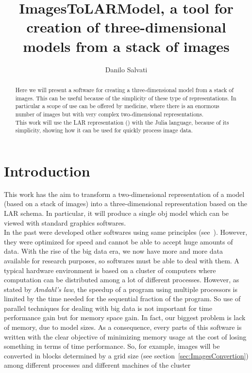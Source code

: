 \documentclass[11pt,oneside]{article}	%
\title{ImagesToLARModel, a tool for creation of three-dimensional models from a stack of images}
\author{Danilo Salvati}
\begin{document}
\maketitle

\begin{abstract}
Here we will present a software for creating a three-dimensional model from a stack of images. This can be useful because of the simplicity of these type of representations. In particular a scope of use can be offered by medicine, where there is an enormous number of images but with very complex two-dimensional representations.\\

This work will use the LAR representation (\cite{cclar-proj:2013:00}) with the Julia language, because of its simplicity, showing how it can be used for quickly process image data.

\end{abstract}

\newpage
\tableofcontents
\newpage

\section{Introduction}\label{sec:intro}

This work has the aim to transform a two-dimensional representation of a model (based on a stack of images) into a three-dimensional representation based on the LAR schema. In particular, it will produce a single obj model which can be viewed with standard graphics softwares.\\

In the past were developed other softwares using same principles (see~\cite{paodcvjcadanda2015}). However, they were optimized for speed and cannot be able to accept huge amounts of data. With the rise of the big data era, we now have more and more data available for research purposes, so softwares must be able to deal with them. A typical hardware environment is based on a cluster of computers where computation can be distributed among a lot of different processes. However, as stated by \textit{Amdahl's law}, the speedup of a program using multiple processors is limited by the time needed for the sequential fraction of the program. So use of parallel techniques for dealing with big data is not important for time performance gain but for memory space gain. In fact, our biggest problem is lack of memory, due to model sizes. As a consequence, every parts of this software is written with the clear objective of minimizing memory usage at the cost of losing something in terms of time performance. So, for example, images will be converted in blocks determined by a grid size (see section~\ref{sec:ImagesConvertion}) among different processes and different machines of the cluster
\end{document}
